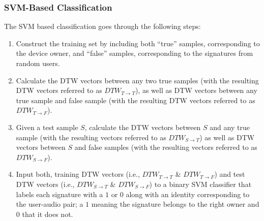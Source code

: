 \subsubsection{SVM-Based Classification}
The SVM based classification goes through the following steps:
\begin{enumerate}
\item Construct the training set by including both ``true'' samples,
corresponding to the device owner, and ``false'' samples, corresponding to the
signatures from random users.
\item Calculate the DTW vectors between any two true samples (with the
resulting DTW vectors referred to as $DTW_{T\rightarrow T}$), as well as DTW
vectors between any true sample and false sample (with the resulting DTW
vectors referred to as $DTW_{T\rightarrow F}$).
\item Given a test sample $S$, calculate the
DTW vectors between $S$ and any true sample (with the resulting vectors
referred to as $DTW_{S\rightarrow T}$) as well as DTW vectors between $S$ and
false samples (with the resulting vectors referred to as $DTW_{S\rightarrow
F}$).
\item Input both, training DTW vectors (i.e., $DTW_{T\rightarrow T}$ \&
$DTW_{T\rightarrow F}$) and test DTW vectors (i.e., $DTW_{S\rightarrow T}$
\& $DTW_{S\rightarrow F}$) to a binary SVM classifier that labels each
signature with a $1$ or $0$ along with an identity corresponding to the
user-audio pair; a $1$ meaning the signature belongs to the right owner and
$0$ that it does not.
\end{enumerate}

